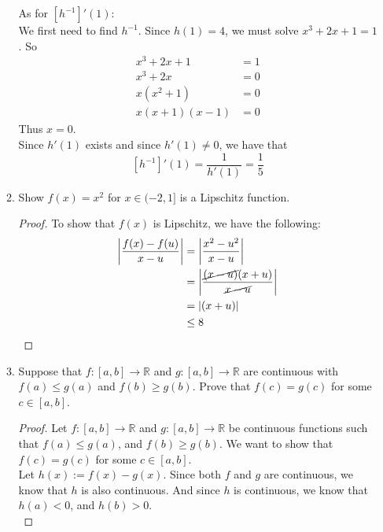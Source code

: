 \documentclass[12pt,letterpaper]{article}
\newcommand{\abs}[1]{\left\lvert #1 \right\rvert}
\newcommand{\R}{\mathbb{R}}
\theoremstyle{case}
\theoremstyle{definition}
\begin{document}
\begin{enumerate}
\begin{enumerate}
			As for $[h^{-1}]'(1)$:\\
			
			We first need to find $h^{-1}$. Since $h(1)=4$, we must solve $x^3+2x+1=1$. So
			\begin{align*}
				x^3+2x+1 &= 1 \\
				x^3+2x &= 0 \\
				x(x^2+1) &= 0 \\
				x(x+1)(x-1) &= 0
			\end{align*}
			Thus $x=0$.\\
			
			Since $h'(1)$ exists and since $h'(1) \neq 0$, we have that 
			\[[h^{-1}]'(1) = \frac{1}{h'(1)} = \frac{1}{5}\]
			\item Show $f(x)=x^2$ for $x \in (-2,1]$ is a Lipschitz function.\\
			\begin{proof}
				To show that $f(x)$ is Lipschitz, we have the following:
				\begin{align*}
					\abs{\frac{f(x)-f(u)}{x-u}} &= \abs{\frac{x^2-u^2}{x-u}} \\
					&= \abs{\frac{\cancel{(x-u)}(x+u)}{\cancel{x-u}}} \\
					&= |(x+u)| \\
					&\leq 8
				\end{align*}
			\end{proof}
			\item Suppose that $f:[a,b] \to \R$ and $g:[a,b] \to \R$ are continuous with $f(a) \leq g(a)$ and $f(b) \geq g(b)$. Prove that $f(c)=g(c)$ for some $c \in [a,b]$.\\
			
			\begin{proof}
				Let $f:[a,b] \to \R$ and $g:[a,b] \to \R$ be continuous functions such that $f(a) \leq g(a)$, and $f(b) \geq g(b)$. We want to show that $f(c)=g(c)$ for some $c \in [a,b]$.\\
				
				Let $h(x):=f(x)-g(x)$. Since both $f$ and $g$ are continuous, we know that $h$ is also continuous. And since $h$ is continuous, we know that $h(a)<0$, and $h(b)>0$.\\
				

\end{proof}
\end{enumerate}
\end{enumerate}
\end{document}
